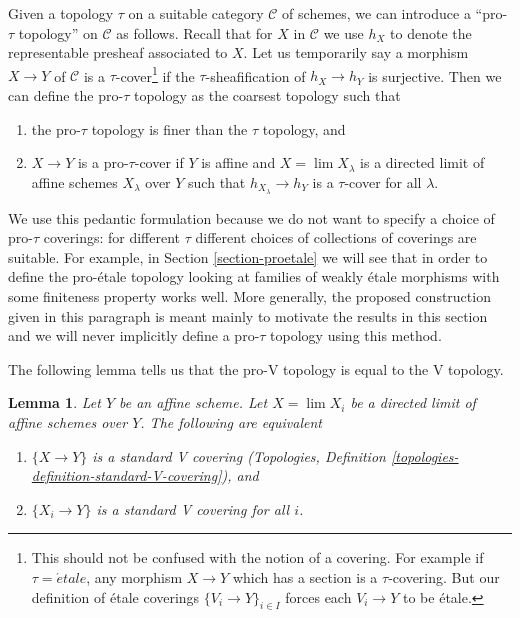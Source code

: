 \documentclass{stacks-project}
\theoremstyle{plain}
\newtheorem{lemma}[subsection]{Lemma}
\theoremstyle{definition}
\theoremstyle{remark}
\numberwithin{equation}{subsection}
\def\lim{\mathop{\mathrm{lim}}\nolimits}
\def\etale{{\acute{e}tale}}
\begin{document}
\medskip\noindent
Given a topology $\tau$ on a suitable category $\mathcal{C}$
of schemes, we can introduce a ``pro-$\tau$ topology''
on $\mathcal{C}$ as follows. Recall that for $X$ in $\mathcal{C}$
we use $h_X$ to denote the representable presheaf associated to $X$.
Let us temporarily say a morphism $X \to Y$ of $\mathcal{C}$
is a $\tau$-cover\footnote{This should not be confused with
the notion of a covering. For example if $\tau = \etale$,
any morphism $X \to Y$ which has a section is a $\tau$-covering. But our
definition of \'etale coverings $\{V_i \to Y\}_{i \in I}$
forces each $V_i \to Y$ to be \'etale.}
if the $\tau$-sheafification of $h_X \to h_Y$
is surjective. Then we can define the pro-$\tau$ topology
as the coarsest topology such that
\begin{enumerate}
\item the pro-$\tau$ topology is finer than the $\tau$ topology, and
\item $X \to Y$ is a pro-$\tau$-cover if
$Y$ is affine and $X = \lim X_\lambda$ is a directed
limit of affine schemes $X_\lambda$ over $Y$ such that
$h_{X_\lambda} \to h_Y$ is a $\tau$-cover for all $\lambda$.
\end{enumerate}
We use this pedantic formulation because we do not want to
specify a choice of pro-$\tau$ coverings: for different $\tau$
different choices of collections of coverings are suitable.
For example, in Section \ref{section-proetale} we will see that
in order to define the pro-\'etale topology looking at families
of weakly \'etale morphisms with some finiteness property works well.
More generally, the proposed construction given in this paragraph is
meant mainly to motivate the results in this section and we will never
implicitly define a pro-$\tau$ topology using this method.

\medskip\noindent
The following lemma tells us that the
pro-V topology is equal to the V topology.

\begin{lemma}
\label{lemma-pro-V-V}
Let $Y$ be an affine scheme. Let $X = \lim X_i$ be a directed limit
of affine schemes over $Y$. The following are equivalent
\begin{enumerate}
\item $\{X \to Y\}$ is a standard V covering
(Topologies, Definition \ref{topologies-definition-standard-V-covering}), and
\item $\{X_i \to Y\}$ is a standard V covering for all $i$.
\end{enumerate}
\end{lemma}
\end{document}
